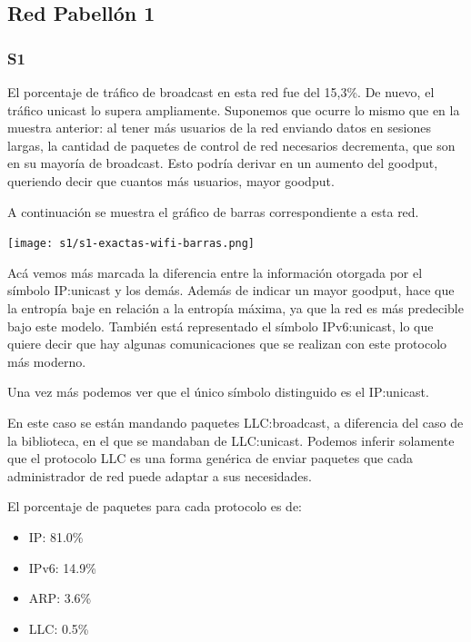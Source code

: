 \subsection{Red Pabellón 1}
\subsubsection{S1}
El porcentaje de tráfico de broadcast en esta red fue del 15,3\%. De nuevo, el
tráfico unicast lo supera ampliamente. Suponemos que ocurre lo mismo que en 
la muestra anterior: al tener más usuarios de la red enviando datos en 
sesiones largas, la cantidad de paquetes de control de red necesarios 
decrementa, que son en su mayoría de broadcast.
Esto podría derivar en un aumento del goodput, queriendo decir que cuantos 
más usuarios, mayor goodput.

A continuación se muestra el gráfico de barras correspondiente a esta red.

\begin{center}
\texttt{[image: s1/s1-exactas-wifi-barras.png]}
\end{center}

Acá vemos más marcada la diferencia entre la información otorgada por el
símbolo IP:unicast y los demás. Además de indicar un mayor goodput, 
hace que la entropía baje en relación a la entropía máxima, ya que la
red es más predecible bajo este modelo. También está representado el
símbolo IPv6:unicast, lo que quiere decir que hay algunas comunicaciones
que se realizan con este protocolo más moderno.


Una vez más podemos ver que el único símbolo distinguido es el IP:unicast.


En este caso se están mandando paquetes LLC:broadcast, a diferencia del caso
de la biblioteca, en el que se mandaban de LLC:unicast. Podemos inferir solamente
que el protocolo LLC es una forma genérica de enviar paquetes que cada administrador
de red puede adaptar a sus necesidades.


El porcentaje de paquetes para cada protocolo es de:
\begin{itemize}
\item IP: 81.0\%
\item IPv6: 14.9\%
\item ARP: 3.6\%
\item LLC: 0.5\%
\end{itemize}

